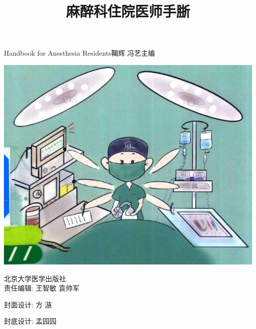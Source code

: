 \documentclass[10pt]{article}
\title{麻醉科住院医师手䏳 }
\author{}
\date{}
\begin{document}
\maketitle
 Handbook for Anesthesia Residents鞨辉 冯艺主编

\begin{center}
\includegraphics[max width=\textwidth]{2024_07_05_645bb794a4d4f32ee0c8g-001}
\end{center}

北京大学医学出版社\\
责任编辑: 王智敏 袁帅军

封面设计: 方 㵀

封底设计: 孟园园
\end{document}
